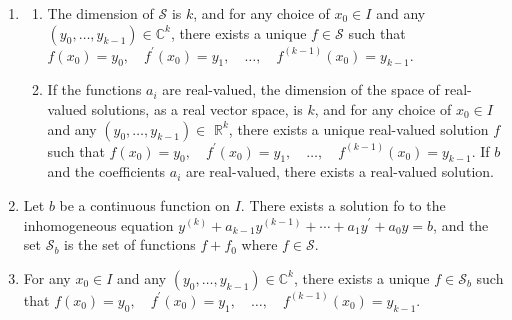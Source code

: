\documentclass[10pt,landscape]{article}
\begin{document}
\begin{multicols}{3}
\begin{enumerate}
        \item \begin{enumerate}
                \item The dimension of $\mathcal{S}$ is $k$, and for any choice of $x_{0} \in I$ and any $\left(y_{0}, \ldots, y_{k-1}\right) \in \mathbb{C}^{k}$, there exists a unique $f \in \mathcal{S}$ such that
                $f\left(x_{0}\right)=y_{0}, \quad f^{\prime}\left(x_{0}\right)=y_{1}, \quad \ldots, 
                \quad f^{(k-1)}\left(x_{0}\right)=y_{k-1}$.
                \item If the functions $a_{i}$ are real-valued, the dimension of the space of real-valued solutions, 
                as a real vector space, is $k$, and for any choice of $x_{0} \in I$ and any $\left(y_{0}, \ldots, y_{k-1}\right) \in$ $\mathbb{R}^{k}$, 
                there exists a unique real-valued solution $f$ such that
                $f\left(x_{0}\right)=y_{0}, \quad f^{\prime}\left(x_{0}\right)=y_{1}, \quad \ldots, \quad f^{(k-1)}\left(x_{0}\right)=y_{k-1}$.
                If $b$ and the coefficients $a_{i}$ are real-valued, there exists a real-valued solution.
        \end{enumerate}
        \item  Let $b$ be a continuous function on $I$. There exists a solution fo to the inhomogeneous equation
        $y^{(k)}+a_{k-1} y^{(k-1)}+\cdots+a_{1} y^{\prime}+a_{0} y=b$,
        and the set $\mathcal{S}_{b}$ is the set of functions $f+f_{0}$ where $f \in \mathcal{S}$.
        \item For any $x_{0} \in I$ and any $\left(y_{0}, \ldots, y_{k-1}\right) \in \mathbb{C}^{k}$, there exists a unique $f \in \mathcal{S}_{b}$ such that
        $f\left(x_{0}\right)=y_{0}, \quad f^{\prime}\left(x_{0}\right)=y_{1}, \quad \ldots, \quad f^{(k-1)}\left(x_{0}\right)=y_{k-1}$.      
\end{enumerate}

\end{multicols}
\end{document}
